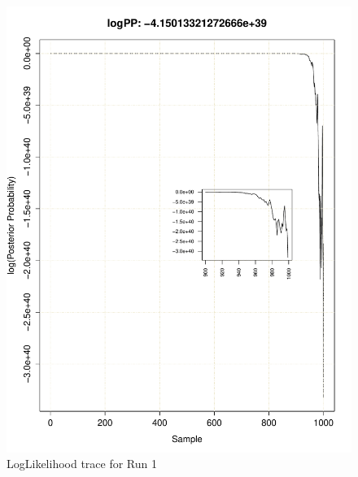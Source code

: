 \documentclass[11pt]{labbook}
\begin{document}
\begin{itemize}
    \begin{figure}
        \centering
        \includegraphics[scale=.65]{FONSE_Plots/2016/June_24/Run1_LogLikeTrace}
        \caption{LogLikelihood trace for Run 1}
        \label{fig:JUN24_LOG_R1}
    \end{figure}
    \begin{figure}
        \centering

\end{figure}
\end{itemize}
\end{document}
